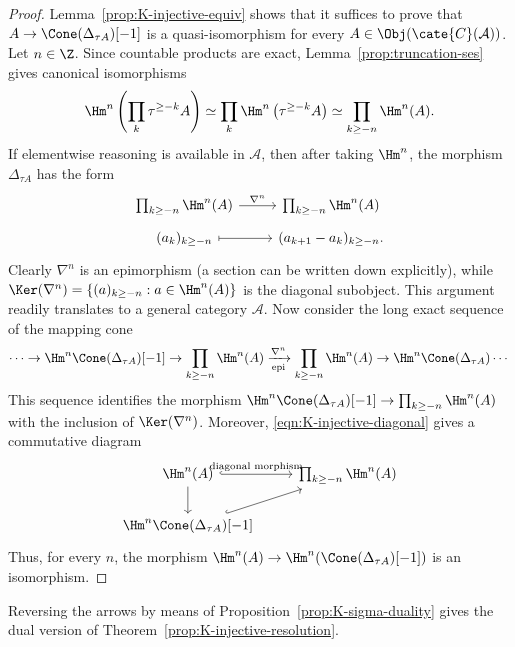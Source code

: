 \begin{proof}
	Lemma~\ref{prop:K-injective-equiv} shows that it suffices to prove that
	$A\to\Cone(\Delta_{\tau A})[-1]$ is a quasi-isomorphism for every
	$A\in\Obj(\cate{C}(\mathcal{A}))$. Let $n\in\Z$. Since countable
	products are exact, Lemma~\ref{prop:truncation-ses} gives canonical
	isomorphisms
	\[
	\Hm^n\left( \prod_k \tau^{\geq -k} A \right)
	\simeq \prod_k \Hm^n\left( \tau^{\geq -k} A \right)
	\simeq \prod_{k \geq -n} \Hm^n(A).
	\]
	If elementwise reasoning is available in $\mathcal{A}$, then after
	taking $\Hm^n$, the morphism $\Delta_{\tau A}$ has the form
	\[\begin{tikzcd}[row sep=tiny]
		\prod_{k \geq -n} \Hm^n(A) \arrow[r, "\nabla^n"] &
		\prod_{k \geq -n} \Hm^n(A) \\
		(a_k)_{k \geq -n} \arrow[mapsto, r] &
		(a_{k+1} - a_k)_{k \geq -n}.
	\end{tikzcd}\]
	Clearly $\nabla^n$ is an epimorphism (a section can be written down
	explicitly), while
	$\Ker(\nabla^n)=\{(a)_{k\geq-n}:a\in\Hm^n(A)\}$ is the diagonal
	subobject. This argument readily translates to a general category
	$\mathcal{A}$. Now consider the long exact sequence of the mapping cone
	\[
	\cdots \to \Hm^n \Cone(\Delta_{\tau A})[-1]
	\to \prod_{k \geq -n} \Hm^n(A)
	\xrightarrow[\text{epi}]{\nabla^n}
	\prod_{k \geq -n} \Hm^n(A)
	\to \Hm^n \Cone(\Delta_{\tau A}) \cdots
	\]
	This sequence identifies the morphism
	$\Hm^n\Cone(\Delta_{\tau A})[-1]\to
	\prod_{k\geq-n}\Hm^n(A)$ with the inclusion of
	$\Ker(\nabla^n)$. Moreover, \eqref{eqn:K-injective-diagonal} gives a
	commutative diagram
	\[\begin{tikzcd}
		\Hm^n(A) \arrow[d]
		\arrow[hookrightarrow, r, "\text{diagonal morphism}"] &
		\prod_{k \geq -n} \Hm^n(A) \\
		\Hm^n {\Cone(\Delta_{\tau A})[-1]} \arrow[hookrightarrow, ru] &
	\end{tikzcd}\]
	Thus, for every $n$, the morphism
	$\Hm^n(A)\to\Hm^n(\Cone(\Delta_{\tau A})[-1])$ is an isomorphism.
\end{proof}

Reversing the arrows by means of Proposition~\ref{prop:K-sigma-duality}
gives the dual version of Theorem~\ref{prop:K-injective-resolution}.

